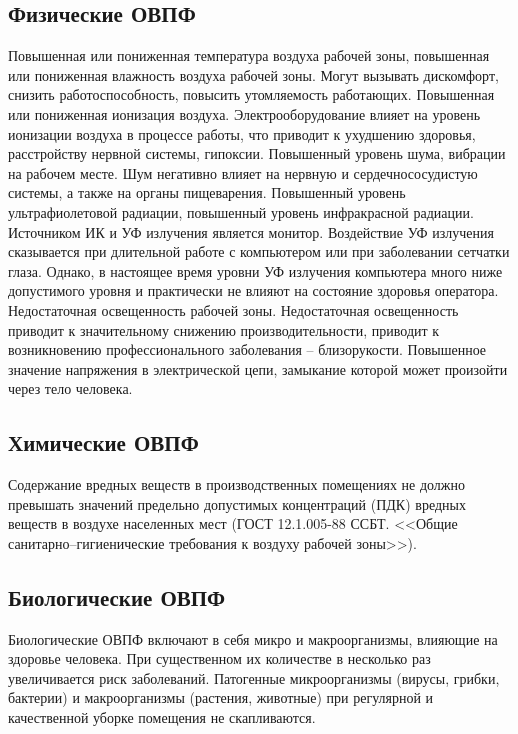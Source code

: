 \documentclass[utf8,usehyperref,12pt]{G7-32}
\begin{document}
\subsection{Физические ОВПФ}
Повышенная или пониженная температура воздуха рабочей зоны, повышенная или пониженная влажность воздуха рабочей зоны. Могут вызывать дискомфорт, снизить работоспособность, повысить утомляемость работающих.
Повышенная или пониженная ионизация воздуха. Электрооборудование влияет на уровень ионизации воздуха в процессе работы, что приводит к ухудшению здоровья, расстройству нервной системы, гипоксии.
Повышенный уровень шума, вибрации на рабочем месте.  Шум негативно влияет на нервную и сердечнососудистую системы, а также на органы пищеварения.
Повышенный уровень ультрафиолетовой радиации, повышенный уровень инфракрасной радиации. Источником ИК и УФ излучения является монитор. Воздействие УФ излучения сказывается при длительной работе с компьютером или при заболевании сетчатки глаза. Однако, в настоящее время уровни УФ излучения компьютера много ниже допустимого уровня и практически не влияют на состояние здоровья оператора.
Недостаточная освещенность рабочей зоны. Недостаточная освещенность приводит к значительному снижению производительности, приводит к возникновению профессионального заболевания – близорукости.
Повышенное значение напряжения в электрической цепи, замыкание которой может произойти через тело человека. 

\subsection{Химические ОВПФ}
Содержание вредных веществ в производственных помещениях не должно превышать значений предельно допустимых концентраций (ПДК) вредных веществ в воздухе населенных мест (ГОСТ 12.1.005-88 ССБТ. <<Общие санитарно–гигиенические требования к воздуху рабочей зоны>>).

\subsection{Биологические ОВПФ}
Биологические ОВПФ включают в себя микро и макроорганизмы, влияющие на здоровье человека. При существенном их количестве в несколько раз увеличивается риск заболеваний. Патогенные микроорганизмы (вирусы, грибки, бактерии) и макроорганизмы (растения, животные) при регулярной и качественной уборке помещения не скапливаются.
\end{document}
